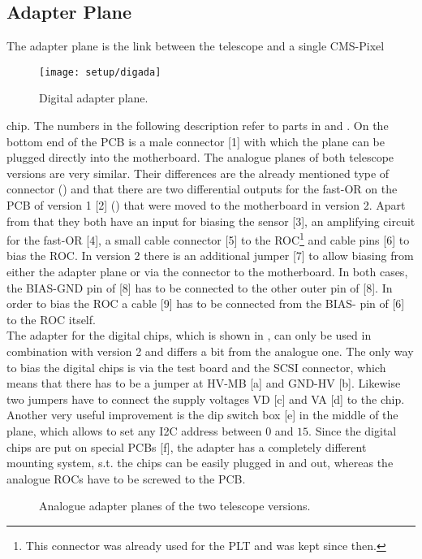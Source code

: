 \subsection{Adapter Plane}\label{s211}
The adapter plane is the link between the telescope and a single \ac{CMS}-Pixel 
\begin{wrapfigure}{r}{5cm}
	\vspace*{-10pt}
	\texttt{[image: setup/digada]}
	\caption{Digital adapter plane.}
	\label{p6}
	\vspace*{-5pt}
\end{wrapfigure} 
chip. The numbers in the following description refer to parts in  and . On the bottom end of the \ac{PCB} is a male connector [1] with which the plane can be plugged directly into the motherboard. The analogue planes of both telescope versions are very similar. Their differences are the already mentioned type of connector () and that there are two differential outputs for the fast-OR on the PCB of version 1 [2] () that were moved to the motherboard in version 2. Apart from that they both have an input for biasing the sensor [3], an amplifying circuit for the fast-OR [4], a small cable connector [5] to the \ac{ROC}\footnote[3]{This connector was already used for the \ac{PLT} and was kept since then.} and cable pins [6] to bias the \ac{ROC}. In version 2 there is an additional jumper [7] to allow biasing from either the adapter plane or via the connector to the motherboard. In both cases, the BIAS-GND pin of [8] has to be connected to the other outer pin of [8]. In order to bias the \ac{ROC} a cable [9] has to be connected from the BIAS- pin of [6] to the \ac{ROC} itself.\\
The adapter for the digital chips, which is shown in , can only be used in combination with version 2 and differs a bit from the analogue one. The only way to bias the digital chips is via the test board and the SCSI connector, which means that there has to be a jumper at HV-MB [a] and GND-HV [b]. Likewise two jumpers have to connect the supply voltages VD [c] and VA [d] to the chip. Another very useful improvement is the dip switch box [e] in the middle of the plane, which allows to set any \ac{I2C} address between $0$ and $15$. Since the digital chips are put on special \ac{PCB}s [f], the adapter has a completely different mounting system, s.t. the chips can be easily plugged in and out, whereas the analogue \ac{ROC}s have to be screwed to the \ac{PCB}.
\begin{figure}[ht]
	\centering
	\hfill
	\caption{Analogue adapter planes of the two telescope versions.}
	\label{padaana}
\end{figure}\no
